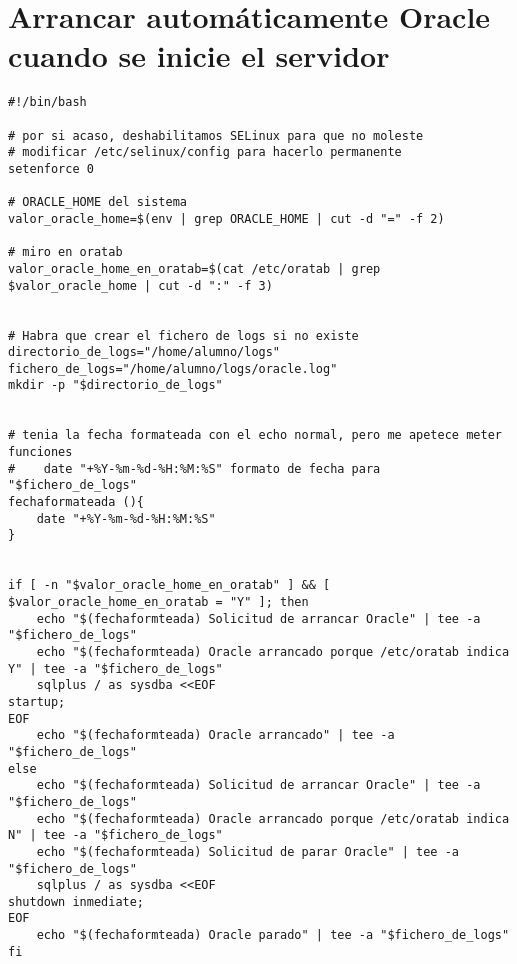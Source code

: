 \documentclass[11pt]{article}
\begin{document}
\section{Arrancar automáticamente Oracle cuando se inicie el servidor}
\label{sec:org62cb794}
\begin{verbatim}
#!/bin/bash

# por si acaso, deshabilitamos SELinux para que no moleste
# modificar /etc/selinux/config para hacerlo permanente
setenforce 0

# ORACLE_HOME del sistema
valor_oracle_home=$(env | grep ORACLE_HOME | cut -d "=" -f 2)

# miro en oratab
valor_oracle_home_en_oratab=$(cat /etc/oratab | grep $valor_oracle_home | cut -d ":" -f 3)


# Habra que crear el fichero de logs si no existe
directorio_de_logs="/home/alumno/logs"
fichero_de_logs="/home/alumno/logs/oracle.log"
mkdir -p "$directorio_de_logs"


# tenia la fecha formateada con el echo normal, pero me apetece meter funciones
#    date "+%Y-%m-%d-%H:%M:%S" formato de fecha para "$fichero_de_logs"
fechaformateada (){
    date "+%Y-%m-%d-%H:%M:%S"
}


if [ -n "$valor_oracle_home_en_oratab" ] && [ $valor_oracle_home_en_oratab = "Y" ]; then
    echo "$(fechaformteada) Solicitud de arrancar Oracle" | tee -a "$fichero_de_logs"
    echo "$(fechaformteada) Oracle arrancado porque /etc/oratab indica Y" | tee -a "$fichero_de_logs"
    sqlplus / as sysdba <<EOF
startup;
EOF
    echo "$(fechaformteada) Oracle arrancado" | tee -a "$fichero_de_logs"
else
    echo "$(fechaformteada) Solicitud de arrancar Oracle" | tee -a "$fichero_de_logs"
    echo "$(fechaformteada) Oracle arrancado porque /etc/oratab indica N" | tee -a "$fichero_de_logs"
    echo "$(fechaformteada) Solicitud de parar Oracle" | tee -a "$fichero_de_logs"
    sqlplus / as sysdba <<EOF
shutdown inmediate;
EOF
    echo "$(fechaformteada) Oracle parado" | tee -a "$fichero_de_logs"    
fi
\end{verbatim}
\end{document}
